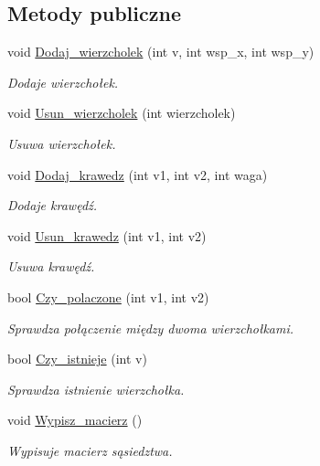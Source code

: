 \subsection*{\-Metody publiczne}
\begin{DoxyCompactItemize}
\item 
void \hyperlink{class_graf_a2e9f4052ea562478c80b43d786c9068a}{\-Dodaj\-\_\-wierzcholek} (int v, int wsp\-\_\-x, int wsp\-\_\-y)
\begin{DoxyCompactList}\small\item\em \-Dodaje wierzchołek. \end{DoxyCompactList}\item 
void \hyperlink{class_graf_ad1091bfe67b16460cd64aebdcbb5b521}{\-Usun\-\_\-wierzcholek} (int wierzcholek)
\begin{DoxyCompactList}\small\item\em \-Usuwa wierzchołek. \end{DoxyCompactList}\item 
void \hyperlink{class_graf_ae12b5623e92fa86ff51d51db1804e793}{\-Dodaj\-\_\-krawedz} (int v1, int v2, int waga)
\begin{DoxyCompactList}\small\item\em \-Dodaje krawędź. \end{DoxyCompactList}\item 
void \hyperlink{class_graf_af2ca22dd1730ce9067e484cf21db5b3f}{\-Usun\-\_\-krawedz} (int v1, int v2)
\begin{DoxyCompactList}\small\item\em \-Usuwa krawędź. \end{DoxyCompactList}\item 
bool \hyperlink{class_graf_affe4be381a025ca350ccc86ff68ea9d1}{\-Czy\-\_\-polaczone} (int v1, int v2)
\begin{DoxyCompactList}\small\item\em \-Sprawdza połączenie między dwoma wierzchołkami. \end{DoxyCompactList}\item 
bool \hyperlink{class_graf_a922eadf981e7dcd36bdbbdac102ee8e7}{\-Czy\-\_\-istnieje} (int v)
\begin{DoxyCompactList}\small\item\em \-Sprawdza istnienie wierzchołka. \end{DoxyCompactList}\item 
void \hyperlink{class_graf_a284d7f2e4bab1832220ce41fdef5d024}{\-Wypisz\-\_\-macierz} ()
\begin{DoxyCompactList}\small\item\em \-Wypisuje macierz sąsiedztwa. \end{DoxyCompactList}\item 

\end{DoxyCompactItemize}
